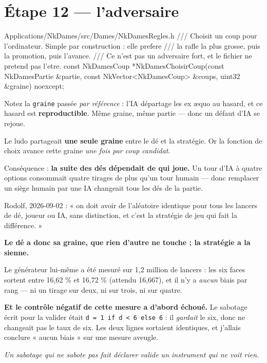 \section{Étape 12 --- l'adversaire}

\begin{nkcode}{Applications/NkDames/src/Dames/NkDamesRegles.h}
/// Choisit un coup pour l'ordinateur. Simple par construction : elle prefere
/// la rafle la plus grosse, puis la promotion, puis l'avance.
/// Ce n'est pas un adversaire fort, et le fichier ne pretend pas l'etre.
const NkDamesCoup *NkDamesChoisirCoup(const NkDamesPartie &partie,
                                      const NkVector<NkDamesCoup> &coups,
                                      uint32 &graine) noexcept;
\end{nkcode}

\begin{nkretenir}
Notez la \texttt{graine} passée \emph{par référence} : l'IA départage les
ex \ae quo au hasard, et ce hasard est \textbf{reproductible}. Même graine, même
partie --- donc un défaut d'IA se rejoue.
\end{nkretenir}

\begin{nkpiege}
Le ludo partageait \textbf{une seule graine} entre le dé et la stratégie. Or la
fonction de choix avance cette graine \emph{une fois par coup candidat}.

Conséquence : \textbf{la suite des dés dépendait de qui joue.} Un tour d'IA à
quatre options consommait quatre tirages de plus qu'un tour humain --- donc
remplacer un siège humain par une IA changeait tous les dés de la partie.

Rodolf, 2026-09-02 : « on doit avoir de l'aléatoire identique pour tous les
lancers de dé, joueur ou IA, sans distinction, et c'est la stratégie de jeu qui
fait la différence. »

\textbf{Le dé a donc sa graine, que rien d'autre ne touche ; la stratégie a la
sienne.}
\end{nkpiege}

\begin{nkretenir}
Le générateur lui-même a été mesuré sur 1,2 million de lancers : les six faces
sortent entre 16,62 \% et 16,72 \% (attendu 16,667), et il n'y a \emph{aucun}
biais par rang --- ni un tirage sur deux, ni sur trois, ni sur quatre.

\alerte{} \textbf{Et le contrôle négatif de cette mesure a d'abord échoué.} Le sabotage
écrit pour la valider était \texttt{d = 1 if d < 6 else 6} : il \emph{gardait} le
six, donc ne changeait pas le taux de six. Les deux lignes sortaient identiques,
et j'allais conclure « aucun biais » sur une mesure aveugle.

\emph{Un sabotage qui ne sabote pas fait déclarer valide un instrument qui ne
voit rien.}
\end{nkretenir}

